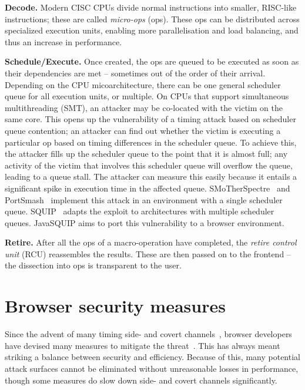 \documentclass[11pt,
  titlepage=false,
]{scrreprt}
\begin{document}
\textbf{Decode.}
Modern CISC CPUs divide normal instructions into smaller, RISC-like instructions;
these are called \textit{micro-ops} (\textmu ops).
These \textmu ops can be distributed across specialized execution units, enabling more parallelisation and load balancing, and thus an increase in performance.

\textbf{Schedule/Execute.}
Once created, the \textmu ops are queued to be executed as soon as their dependencies are met -- sometimes out of the order of their arrival.
Depending on the CPU micoarchitecture, there can be one general scheduler queue for all execution units, or multiple.
On CPUs that support simultaneous multithreading (SMT), an attacker may be co-located with the victim on the same core.
This opens up the vulnerability of a timing attack based on scheduler queue contention;
an attacker can find out whether the victim is executing a particular \textmu op based on timing differences in the scheduler queue.
To achieve this, the attacker fills up the scheduler queue to the point that it is almost full;
any activity of the victim that involves this scheduler queue will overflow the queue, leading to a queue stall.
The attacker can measure this easily because it entails a significant spike in execution time in the affected queue.
SMoTherSpectre~\cite{Bhattacharyya2019} and PortSmash~\cite{Aldaya2019port} implement this attack in an environment with a single scheduler queue.
SQUIP~\cite{squip} adapts the exploit to architectures with multiple scheduler queues.
JavaSQUIP aims to port this vulnerability to a browser environment.

\textbf{Retire.}
After all the \textmu ops of a macro-operation have completed, the \textit{retire control unit} (RCU) reassembles the results.
These are then passed on to the frontend -- the dissection into \textmu ops is transparent to the user.


\section{Browser security measures}
\label{sec:browsersecurity}
Since the advent of many timing side- and covert channels~\cite{noack2018exploiting, Rokicki2022webport, gruss2016rowhammer}, browser developers have devised many measures to mitigate the threat~\cite{shusterman2021prime}.
This has always meant striking a balance between security and efficiency.
Because of this, many potential attack surfaces cannot be eliminated without unreasonable losses in performance, though  some measures do slow down side- and covert channels significantly.
\end{document}
